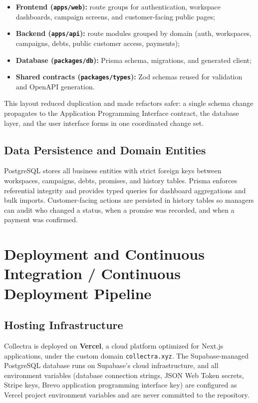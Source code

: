 \documentclass[12pt,a4paper]{report}
\begin{document}
\begin{itemize}
  \item \textbf{Frontend (\texttt{apps/web}):} route groups for authentication, workspace
        dashboards, campaign screens, and customer-facing public pages;
  \item \textbf{Backend (\texttt{apps/api}):} route modules grouped by domain (auth, workspaces,
        campaigns, debts, public customer access, payments);
  \item \textbf{Database (\texttt{packages/db}):} Prisma schema, migrations, and generated client;
  \item \textbf{Shared contracts (\texttt{packages/types}):} Zod schemas reused for validation and
        OpenAPI generation.
\end{itemize}

This layout reduced duplication and made refactors safer: a single schema change propagates to
the Application Programming Interface contract, the database layer, and the user interface forms
in one coordinated change set.

\subsection{Data Persistence and Domain Entities}

PostgreSQL stores all business entities with strict foreign keys between workspaces, campaigns,
debts, promises, and history tables.
Prisma enforces referential integrity and provides typed queries for dashboard aggregations and
bulk imports.
Customer-facing actions are persisted in history tables so managers can audit who changed a
status, when a promise was recorded, and when a payment was confirmed.

\section{Deployment and Continuous Integration / Continuous Deployment Pipeline}
\label{sec:deployment}

\subsection{Hosting Infrastructure}

Collectra is deployed on \textbf{Vercel}, a cloud platform optimized for Next.js
applications, under the custom domain \texttt{collectra.xyz}.
The Supabase-managed PostgreSQL database runs on Supabase's cloud infrastructure,
and all environment variables (database connection strings, JSON Web Token secrets, Stripe keys,
Brevo application programming interface key) are configured as Vercel project environment variables and are never
committed to the repository.
\end{document}

